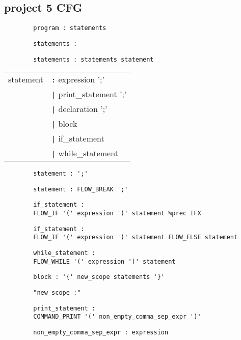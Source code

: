\documentclass[10pt,landscape]{article}
\begin{document}
\begin{multicols}{3}
		\section{project 5 CFG}
		\begin{verbatim}
		program : statements
		\end{verbatim}
		\begin{verbatim}
		statements :
		\end{verbatim}
		\begin{verbatim}
		statements : statements statement
		\end{verbatim}
		\begin{tabular}{ll}
		statement 	&\verb!:! expression ';' \\
			&\verb!|! print\_statement ';'\\
			&\verb!|! declaration ';'\\
			&\verb!|! block\\
			&\verb!|! if\_statement\\
			&\verb!|! while\_statement\\
		\end{tabular}
		\begin{verbatim}
		statement : ';'
		\end{verbatim}
		\begin{verbatim}
		statement : FLOW_BREAK ';'
		\end{verbatim}
		\begin{verbatim}
		if_statement : 
		FLOW_IF '(' expression ')' statement %prec IFX
		\end{verbatim}
		\begin{verbatim}
		if_statement : 
		FLOW_IF '(' expression ')' statement FLOW_ELSE statement
		\end{verbatim}
		\begin{verbatim}
		while_statement : 
		FLOW_WHILE '(' expression ')' statement
		\end{verbatim}
		\begin{verbatim}
		block : '{' new_scope statements '}'
		\end{verbatim}
		\begin{verbatim}
		"new_scope :"
		\end{verbatim}
		\begin{verbatim}
		print_statement : 
		COMMAND_PRINT '(' non_empty_comma_sep_expr ')'
		\end{verbatim}
		\begin{verbatim}
		non_empty_comma_sep_expr : expression
		\end{verbatim}

\end{multicols}
\end{document}
